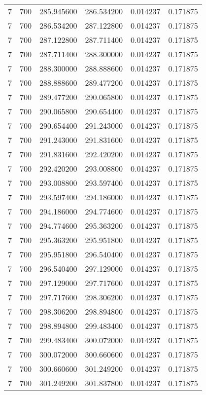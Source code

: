 \begin{longtable}{rrrrrr}
7 & 700 & 285.945600 & 286.534200 & 0.014237 & 0.171875 \\
7 & 700 & 286.534200 & 287.122800 & 0.014237 & 0.171875 \\
7 & 700 & 287.122800 & 287.711400 & 0.014237 & 0.171875 \\
7 & 700 & 287.711400 & 288.300000 & 0.014237 & 0.171875 \\
7 & 700 & 288.300000 & 288.888600 & 0.014237 & 0.171875 \\
7 & 700 & 288.888600 & 289.477200 & 0.014237 & 0.171875 \\
7 & 700 & 289.477200 & 290.065800 & 0.014237 & 0.171875 \\
7 & 700 & 290.065800 & 290.654400 & 0.014237 & 0.171875 \\
7 & 700 & 290.654400 & 291.243000 & 0.014237 & 0.171875 \\
7 & 700 & 291.243000 & 291.831600 & 0.014237 & 0.171875 \\
7 & 700 & 291.831600 & 292.420200 & 0.014237 & 0.171875 \\
7 & 700 & 292.420200 & 293.008800 & 0.014237 & 0.171875 \\
7 & 700 & 293.008800 & 293.597400 & 0.014237 & 0.171875 \\
7 & 700 & 293.597400 & 294.186000 & 0.014237 & 0.171875 \\
7 & 700 & 294.186000 & 294.774600 & 0.014237 & 0.171875 \\
7 & 700 & 294.774600 & 295.363200 & 0.014237 & 0.171875 \\
7 & 700 & 295.363200 & 295.951800 & 0.014237 & 0.171875 \\
7 & 700 & 295.951800 & 296.540400 & 0.014237 & 0.171875 \\
7 & 700 & 296.540400 & 297.129000 & 0.014237 & 0.171875 \\
7 & 700 & 297.129000 & 297.717600 & 0.014237 & 0.171875 \\
7 & 700 & 297.717600 & 298.306200 & 0.014237 & 0.171875 \\
7 & 700 & 298.306200 & 298.894800 & 0.014237 & 0.171875 \\
7 & 700 & 298.894800 & 299.483400 & 0.014237 & 0.171875 \\
7 & 700 & 299.483400 & 300.072000 & 0.014237 & 0.171875 \\
7 & 700 & 300.072000 & 300.660600 & 0.014237 & 0.171875 \\
7 & 700 & 300.660600 & 301.249200 & 0.014237 & 0.171875 \\
7 & 700 & 301.249200 & 301.837800 & 0.014237 & 0.171875 \\

\end{longtable}
